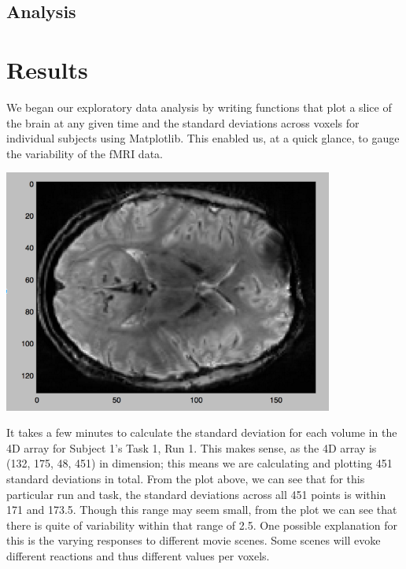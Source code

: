 \documentclass[11pt]{article}
\begin{document}
\subsection{Analysis} 




\section{Results}

We began our exploratory data analysis by writing functions
that plot a slice of the brain at any given time and the standard deviations
across voxels for individual subjects using Matplotlib. This enabled us, at a
quick glance, to gauge the variability of the fMRI data.

\begin{center}
\includegraphics[height=8cm]{7}
\end{center}

It takes a few minutes to calculate the standard deviation for each volume in
the 4D array for Subject 1's Task 1, Run 1. This makes sense, as the 4D
array is (132, 175, 48, 451) in dimension; this means we are calculating and
plotting 451 standard deviations in total. From the plot above, we can see
that for this particular run and task, the standard deviations across all 451
points is within 171 and 173.5. Though this range may seem small, from the
plot we can see that there is quite of variability within that range of 2.5.
One possible explanation for this is the varying responses to different movie
scenes. Some scenes will evoke different reactions and thus different values
per voxels.
\end{document}
